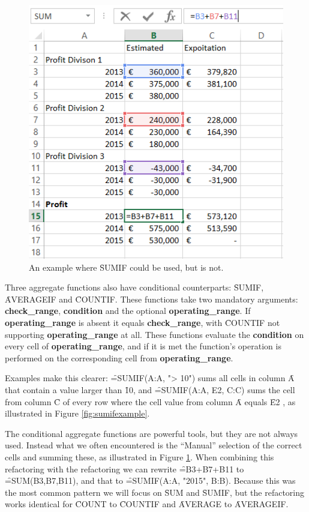 \begin{figure}
	\centering
	\includegraphics{implementation/aggregate/condaggrexample}
	\caption{An example where \f{SUMIF} could be used, but is not.}
	\label{fig:sumifcouldbeused}
\end{figure}

Three aggregate functions also have conditional counterparts: \f{SUMIF}, \f{AVERAGEIF} and \f{COUNTIF}.
These functions take two mandatory arguments: \textbf{check_range}, \textbf{condition} and the optional \textbf{operating_range}.
If \textbf{operating_range} is absent it equals \textbf{check_range}, with \f{COUNTIF} not supporting \textbf{operating_range} at all.
These functions evaluate the \textbf{condition} on every cell of \textbf{operating_range}, and if it is met the function's operation is performed on the corresponding cell from \textbf{operating_range}.

Examples make this clearer: \f{=SUMIF(A:A, "> 10")} sums all cells in column \f{A} that contain a value larger than \f{10}, and \f{=SUMIF(A:A, E2, C:C)} sums the cell from column \f{C} of every row where the cell value from column \f{A} equals \f{E2} , as illustrated in Figure \ref{fig:sumifexample}.

The conditional aggregate functions are powerful tools, but they are not always used. 
Instead what we often encountered is the ``Manual'' selection of the correct cells and summing these, as illustrated in Figure \ref{fig:sumifcouldbeused}.
When combining this refactoring with the  refactoring we can rewrite \f{=B3+B7+B11} to \f{=SUM(B3,B7,B11)}, and that to \f{=SUMIF(A:A, "2015", B:B)}.
Because this was the most common pattern we will focus on \f{SUM} and \f{SUMIF}, but the refactoring works identical for \f{COUNT} to \f{COUNTIF} and \f{AVERAGE} to \f{AVERAGEIF}.

